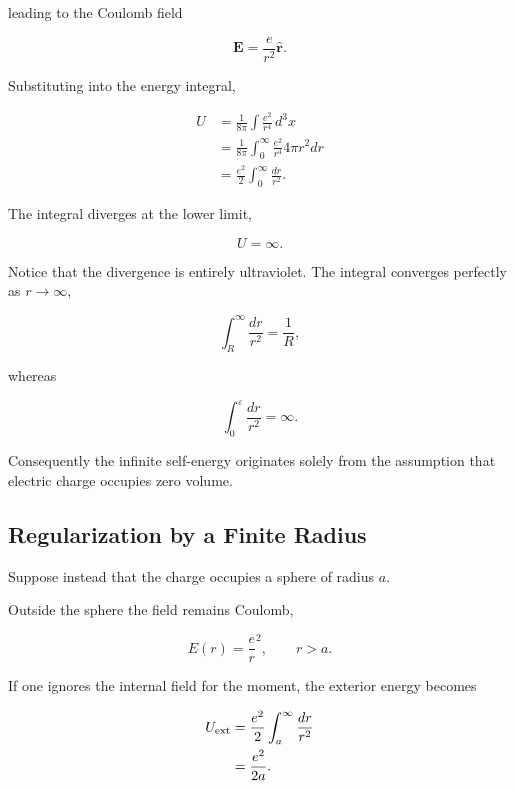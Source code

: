 \begin{enumerate}
leading to the Coulomb field

\begin{equation}
\mathbf E
=
\frac{e}{r^2}\hat{\mathbf r}.
\end{equation}

Substituting into the energy integral,

\begin{align}
U
&=
\frac1{8\pi}
\int
\frac{e^2}{r^4}
\,d^3x
\\
&=
\frac1{8\pi}
\int_0^\infty
\frac{e^2}{r^4}
4\pi r^2dr
\\
&=
\frac{e^2}{2}
\int_0^\infty
\frac{dr}{r^2}.
\end{align}

The integral diverges at the lower limit,

\begin{equation}
U=\infty.
\end{equation}

Notice that the divergence is entirely ultraviolet. The integral converges
perfectly as $r\rightarrow\infty$,

\begin{equation}
\int_R^\infty
\frac{dr}{r^2}
=
\frac1R,
\end{equation}

whereas

\begin{equation}
\int_0^\varepsilon
\frac{dr}{r^2}
=
\infty.
\end{equation}

Consequently the infinite self-energy originates solely from the assumption
that electric charge occupies zero volume.

\subsection{Regularization by a Finite Radius}

Suppose instead that the charge occupies a sphere of radius $a$.

Outside the sphere the field remains Coulomb,

\begin{equation}
E(r)
=
\frac er^2,
\qquad
r>a.
\end{equation}

If one ignores the internal field for the moment, the exterior energy becomes

\begin{align}
U_{\rm ext}
&=
\frac{e^2}{2}
\int_a^\infty
\frac{dr}{r^2}
\\
&=
\frac{e^2}{2a}.
\end{align}


\end{enumerate}

